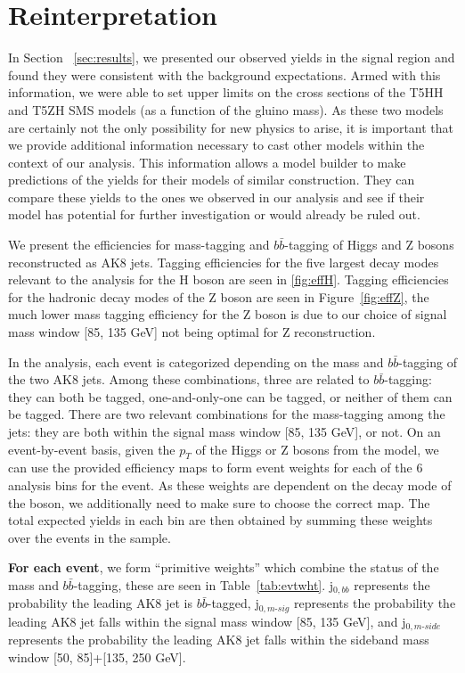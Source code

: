 \chapter{Reinterpretation}
\label{chap:reinterpretation}

In Section ~\ref{sec:results}, we presented our observed yields in the signal region and found they were consistent with the background expectations. Armed with this information, we were able to set upper limits on the cross sections of the T5HH and T5ZH SMS models (as a function of the gluino mass). As these two models are certainly not the only possibility for new physics to arise, it is important that we provide additional information necessary to cast other models within the context of our analysis. This information allows a model builder to make predictions of the yields for their models of similar construction. They can compare these yields to the ones we observed in our analysis and see if their model has potential for further investigation or would already be ruled out.

We present the efficiencies for mass-tagging and $b\bar{b}$-tagging of Higgs and Z bosons reconstructed as AK8 jets. Tagging efficiencies for the five largest decay modes relevant to the analysis for the H boson are seen in \ref{fig:effH}. Tagging efficiencies for the hadronic decay modes of the Z boson are seen in Figure~\ref{fig:effZ}, the much lower mass tagging efficiency for the Z boson is due to our choice of signal mass window [85, 135 GeV] not being optimal for Z reconstruction. 

In the analysis, each event is categorized depending on the mass and $b\bar{b}$-tagging of the two AK8 jets. Among these combinations, three are related to $b\bar{b}$-tagging: they can both be tagged, one-and-only-one can be tagged, or neither of them can be tagged. There are two relevant combinations for the mass-tagging among the jets: they are both within the signal mass window [85, 135 GeV], or not. On an event-by-event basis, given the $p_{T}$ of the Higgs or Z bosons from the model, we can use the provided efficiency maps to form event weights for each of the 6 analysis bins for the event. As these weights are dependent on the decay mode of the boson, we additionally need to make sure to choose the correct map. The total expected yields in each bin are then obtained by summing these weights over the events in the sample.

\textbf{For each event}, we form ``primitive weights'' which combine the status of the mass and $b\bar{b}$-tagging, these are seen in Table~\ref{tab:evtwht}. j$_{0, bb}$ represents the probability the leading AK8 jet is $b\bar{b}$-tagged, j$_{0, m\text{-}sig}$ represents the probability the leading AK8 jet falls within the signal mass window [85, 135 GeV], and j$_{0, m\text{-}side}$ represents the probability the leading AK8 jet falls within the sideband mass window [50, 85]+[135, 250 GeV].

